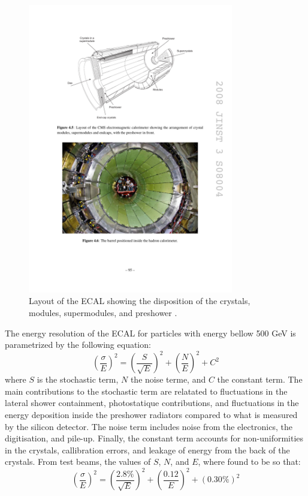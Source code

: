     \begin{figure}[h!]
      \centering
      \includegraphics[width=0.8\textwidth]{img/I-3-cms/ecal.pdf}
      \caption{Layout of the ECAL showing the disposition of the crystals, modules, supermodules, and preshower \cite{1748-0221-3-08-S08004}.}
      \label{fig:I-3-ecal}
    \end{figure}

    The energy resolution of the ECAL for particles with energy bellow 500 GeV is parametrized by the following equation:
    \begin{equation}
      \left( \frac{\sigma}{E} \right)^2 = \left( \frac{S}{\sqrt{E}} \right)^2 + \left( \frac{N}{E} \right)^2 + C^2
    \end{equation}
    where $ S $ is the stochastic term, $ N $ the noise terme, and $ C $ the constant term. The main contributions to the stochastic term are relatated to fluctuations in the lateral shower containment, photostatique contributions, and fluctuations in the energy deposition inside the preshower radiators compared to what is measured by the silicon detector. The noise term includes noise from the electronics, the digitisation, and pile-up. Finally, the constant term accounts for non-uniformities in the crystals, callibration errors, and leakage of energy from the back of the crystals. From test beams, the values of $ S $, $ N $, and $ E $, where found to be so that: \\
    \begin{equation}
      \left( \frac{\sigma}{E} \right)^2 = \left( \frac{2.8\%}{\sqrt{E}} \right)^2 + \left( \frac{0.12}{E} \right)^2 + (0.30\%)^2
    \end{equation}


